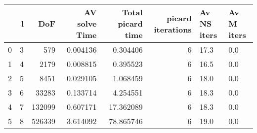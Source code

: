 \begin{tabular}{lrrrrrll}
\toprule
{} &  l &     DoF &  AV solve Time &  Total picard time &  picard iterations & Av NS iters & Av M iters \\
\midrule
0 &  3 &     579 &       0.004136 &           0.304406 &                  6 &        17.3 &        0.0 \\
1 &  4 &    2179 &       0.008815 &           0.395523 &                  6 &        16.5 &        0.0 \\
2 &  5 &    8451 &       0.029105 &           1.068459 &                  6 &        18.0 &        0.0 \\
3 &  6 &   33283 &       0.133714 &           4.254551 &                  6 &        18.3 &        0.0 \\
4 &  7 &  132099 &       0.607171 &          17.362089 &                  6 &        18.3 &        0.0 \\
5 &  8 &  526339 &       3.614092 &          78.865746 &                  6 &        19.0 &        0.0 \\
\bottomrule
\end{tabular}
